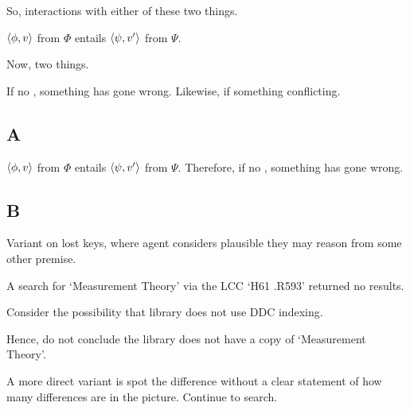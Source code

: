 \begin{note}
  So, interactions with either of these two things.
\end{note}

\begin{note}
  \(\langle \phi, v \rangle\) from \(\Phi\) entails \(\langle \psi, v' \rangle\) from \(\Psi\).

  Now, two things.

  If no \pevent{}, something has gone wrong.
  Likewise, if something conflicting.
\end{note}

\subsection{A}
\label{sec:concludes}

\begin{note}
  \(\langle \phi, v \rangle\) from \(\Phi\) entails \(\langle \psi, v' \rangle\) from \(\Psi\).
  Therefore, if no \pevent{}, something has gone wrong.
\end{note}

\subsection{B}
\label{sec:b}

\begin{note}
  Variant on lost keys, where agent considers plausible they may reason from some other premise.
  {
    \color{red}
    \begin{illustration}
      A search for `Measurement Theory' via the LCC `H61 .R593' returned no results.

      Consider the possibility that library does not use DDC indexing.

      Hence, do not conclude the library does not have a copy of `Measurement Theory'.
    \end{illustration}
  }

  A more direct variant is spot the difference without a clear statement of how many differences are in the picture.
  Continue to search.
\end{note}

